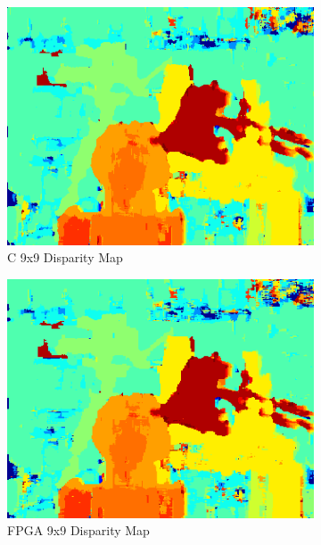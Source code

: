 \begin{figure}
\begin{center}
\begin{subfigure}{0.45\textwidth}
		\includegraphics[width=\textwidth]{figures/tsukuba_c_9x9.png}
		\caption{C 9x9 Disparity Map}
		\label{fig:tsukubaC9x9}
	\end{subfigure}
	\begin{subfigure}{0.45\textwidth}
		\includegraphics[width=\textwidth]{figures/tsukuba_buffer_9x9_4.png}
		\caption{FPGA 9x9 Disparity Map}
		\label{fig:tsukubaFPGA9x9}
	\end{subfigure}
	\\
	\begin{subfigure}{0.45\textwidth}

\end{subfigure}
\end{center}
\end{figure}
